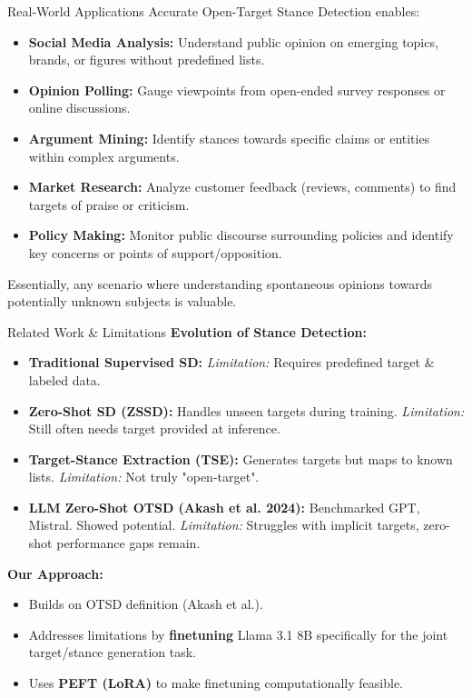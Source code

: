 \documentclass{beamer}
\begin{document}
\begin{frame}{Real-World Applications}
  Accurate Open-Target Stance Detection enables:
  \begin{itemize}
    \item \textbf{Social Media Analysis:} Understand public opinion on emerging topics, brands, or figures without predefined lists.
    \item \textbf{Opinion Polling:} Gauge viewpoints from open-ended survey responses or online discussions.
    \item \textbf{Argument Mining:} Identify stances towards specific claims or entities within complex arguments.
    \item \textbf{Market Research:} Analyze customer feedback (reviews, comments) to find targets of praise or criticism.
    \item \textbf{Policy Making:} Monitor public discourse surrounding policies and identify key concerns or points of support/opposition.
  \end{itemize}
  Essentially, any scenario where understanding spontaneous opinions towards potentially unknown subjects is valuable.
\end{frame}

\begin{frame}{Related Work \& Limitations}
  \textbf{Evolution of Stance Detection:}
  \begin{itemize}
    \item \textbf{Traditional Supervised SD:} \textit{Limitation:} Requires predefined target \& labeled data.
    \item \textbf{Zero-Shot SD (ZSSD):} Handles unseen targets during training. \textit{Limitation:} Still often needs target provided at inference.
    \item \textbf{Target-Stance Extraction (TSE):} Generates targets but maps to known lists. \textit{Limitation:} Not truly "open-target".
    \item \textbf{LLM Zero-Shot OTSD (Akash et al. 2024):} Benchmarked GPT, Mistral. Showed potential. \textit{Limitation:} Struggles with implicit targets, zero-shot performance gaps remain.
  \end{itemize}
  \vfill
  \textbf{Our Approach:}
  \begin{itemize}
    \item Builds on OTSD definition (Akash et al.).
    \item Addresses limitations by \textbf{finetuning} Llama 3.1 8B specifically for the joint target/stance generation task.
    \item Uses \textbf{PEFT (LoRA)} to make finetuning computationally feasible.
  \end{itemize}
\end{frame}
\end{document}
